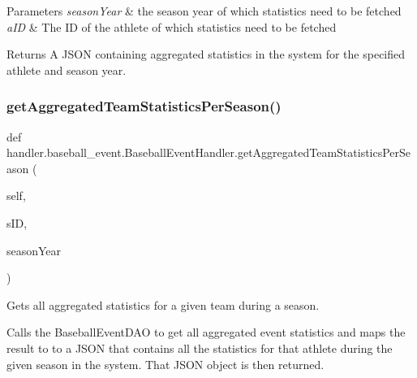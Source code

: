 \begin{DoxyParams}{Parameters}
{\em season\+Year} & the season year of which statistics need to be fetched \\
\hline
{\em a\+ID} & The ID of the athlete of which statistics need to be fetched\\
\hline
\end{DoxyParams}
\begin{DoxyReturn}{Returns}
A J\+S\+ON containing aggregated statistics in the system for the specified athlete and season year. 
\end{DoxyReturn}
\mbox{\label{classhandler_1_1baseball__event_1_1_baseball_event_handler_a269a527fd885804acde180e292145ed7}} 
\subsubsection{\texorpdfstring{get\+Aggregated\+Team\+Statistics\+Per\+Season()}{getAggregatedTeamStatisticsPerSeason()}}
{\footnotesize\ttfamily def handler.\+baseball\+\_\+event.\+Baseball\+Event\+Handler.\+get\+Aggregated\+Team\+Statistics\+Per\+Season (\begin{DoxyParamCaption}\item[{}]{self,  }\item[{}]{s\+ID,  }\item[{}]{season\+Year }\end{DoxyParamCaption})}



Gets all aggregated statistics for a given team during a season. 

Calls the Baseball\+Event\+D\+AO to get all aggregated event statistics and maps the result to to a J\+S\+ON that contains all the statistics for that athlete during the given season in the system. That J\+S\+ON object is then returned.


